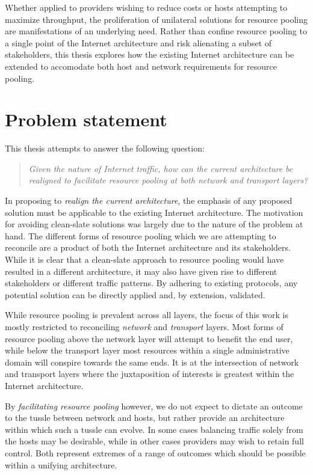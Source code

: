 Whether applied to providers wishing to reduce costs or hosts attempting to maximize throughput, the proliferation of unilateral solutions for resource pooling are manifestations of an underlying need. 
Rather than confine resource pooling to a single point of the Internet architecture and risk alienating a subset of stakeholders, this thesis explores how the existing Internet architecture can be extended to accomodate both host and network requirements for resource pooling.

\section{Problem statement}
\label{sec:introduction:objectives}

This thesis attempts to answer the following question:

\begin{quote}
\textit{
Given the nature of Internet traffic, how can the current architecture be realigned to facilitate resource pooling at both network and transport layers?
}
\end{quote}

In proposing to \emph{realign the current architecture}, the emphasis of any proposed solution must be applicable to the existing Internet architecture.
The motivation for avoiding clean-slate solutions was largely due to the nature of the problem at hand.
The different forms of resource pooling which we are attempting to reconcile are a product of both the Internet architecture and its stakeholders.
While it is clear that a clean-slate approach to resource pooling would have resulted in a different architecture, it may also have given rise to different stakeholders or different traffic patterns.
By adhering to existing protocols, any potential solution can be directly applied and, by extension, validated. 

While resource pooling is prevalent across all layers, the focus of this work is mostly restricted to reconciling \emph{network} and \emph{transport} layers. 
Most forms of resource pooling above the network layer will attempt to benefit the end user, while below the transport layer most resources within a single administrative domain will conspire towards the same ends.
It is at the intersection of network and transport layers where the juxtaposition of interests is greatest within the Internet architecture.

By \emph{facilitating resource pooling} however, we do not expect to dictate an outcome to the tussle between network and hosts, but rather provide an architecture within which such a tussle can evolve.
In some cases balancing traffic solely from the hosts may be desirable, while in other cases providers may wish to retain full control.
Both represent extremes of a range of outcomes which should be possible within a unifying architecture.

